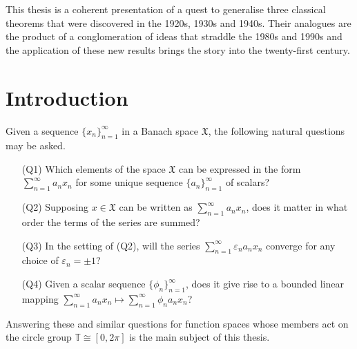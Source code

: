 \documentclass[mstat,12pt]{unswthesis}  %
\newcommand{\T}{\mathbb{T}}
\newcommand{\X}{\mathfrak{X}}
\newcommand\blankpage{%
    \null
    \thispagestyle{empty}%
    \addtocounter{page}{-1}%
    \newpage}
\numberwithin{equation}{section}
\begin{document}


This thesis is a coherent presentation of a quest to generalise three classical
theorems that were discovered in the 1920s, 1930s and 1940s. Their analogues are
the product of a conglomeration of ideas that straddle the 1980s and 1990s and
the application of these new results brings the story into the twenty-first
century.
\afterpage{\blankpage}


\afterpreface





%
%




\afterpage{\blankpage}

\chapter{Introduction}\label{s-intro}

{\noindent}Given a sequence $\{x_n\}_{n=1}^{\infty}$ in a Banach space $\X$,
the following natural questions may be asked.
\begin{enumerate}
\item[(Q1)] Which elements of the space $\X$ can be expressed in the form
$\sum_{n=1}^{\infty}a_nx_n$ for some unique sequence $\{a_n\}_{n=1}^{\infty}$
of scalars?

\item[(Q2)] Supposing $x\in\X$ can be written as $\sum_{n=1}^{\infty}a_nx_n$,
does it matter in what order the terms of the series are summed?

\item[(Q3)] In the setting of (Q2), will the series
$\sum_{n=1}^{\infty}\varepsilon_na_nx_n$ converge for any choice of
$\varepsilon_n=\pm 1$?

\item[(Q4)] Given a scalar sequence $\{\phi_n\}_{n=1}^{\infty}$, does it give
rise to a bounded linear mapping
$\sum_{n=1}^{\infty}a_nx_n\mapsto\sum_{n=1}^{\infty}\phi_na_nx_n$?
\end{enumerate}

{\noindent}Answering these and similar questions for
function spaces whose members act on the circle group $\T\cong[0,2\pi]$
is the main subject of this thesis.
\end{document}
